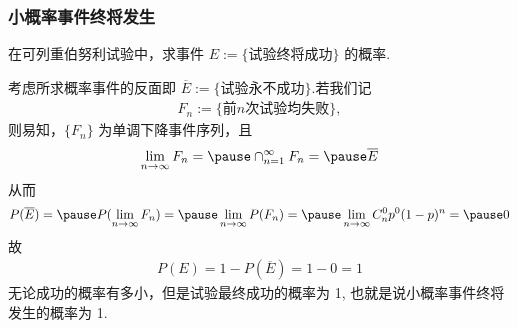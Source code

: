 \documentclass[Prob-All.tex]{subfiles}
\begin{document}
\begin{frame}
	\frametitle{小概率事件终将发生}
	\begin{exam}
		在可列重伯努利试验中，求事件 $E:=\{\mbox{试验终将成功}\}$ 的概率.
	\end{exam}
	\pause

	\jieda 考虑所求概率事件的反面即 $\overline{E}:=\{\mbox{试验永不成功}\}$.\pause 若我们记
	\begin{eqnarray*}
		F_n:=\{\mbox{前} n\mbox{次试验均失败}\},
	\end{eqnarray*}
	\pause
	则易知，$\{F_n\}$ 为单调下降事件序列，且
	\begin{eqnarray*}
		\lim_{n\rightarrow \infty}F_n=\pause \cap_{n=1}^\infty F_n=\pause \overline{E}
	\end{eqnarray*}
	\pause 从而
	\begin{eqnarray*}
		P(\overline{E})=\pause P(\lim_{n\rightarrow\infty}F_n)=\pause \lim_{n\rightarrow\infty }P(F_n)=\pause \lim_{n\rightarrow\infty }C_n^0p^0(1-p)^n=\pause 0
	\end{eqnarray*}
	\pause 故
	\begin{eqnarray*}
		P(E)=1-P(\overline{E})=1-0=1
	\end{eqnarray*}
	\pause 无论成功的概率有多小，但是试验最终成功的概率为 1, 也就是说小概率事件终将发生的概率为 1.
\end{frame}





\end{document}

